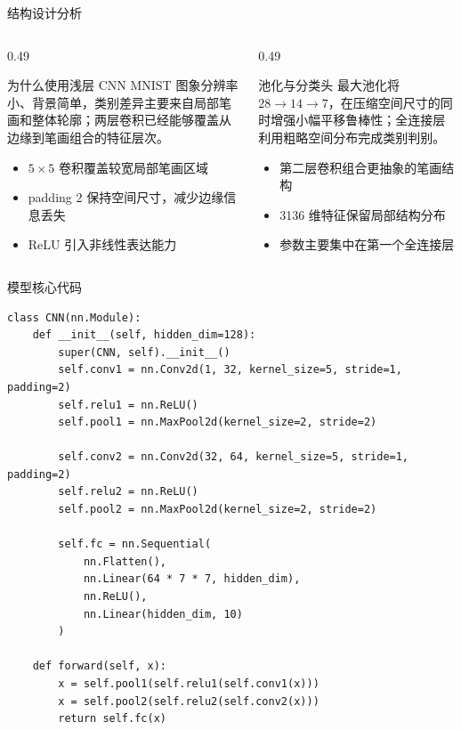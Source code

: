 \documentclass[aspectratio=169,10pt]{ctexbeamer}
\begin{document}
\begin{frame}{结构设计分析}
	\begin{columns}[T,onlytextwidth]
		\begin{column}{0.49\textwidth}
			\begin{block}{为什么使用浅层 CNN}
				MNIST 图象分辨率小、背景简单，类别差异主要来自局部笔画和整体轮廓；两层卷积已经能够覆盖从边缘到笔画组合的特征层次。
			\end{block}
			\begin{itemize}
				\item $5\times5$ 卷积覆盖较宽局部笔画区域
				\item padding 2 保持空间尺寸，减少边缘信息丢失
				\item ReLU 引入非线性表达能力
			\end{itemize}
		\end{column}
		\begin{column}{0.49\textwidth}
			\begin{block}{池化与分类头}
				最大池化将 $28\rightarrow14\rightarrow7$，在压缩空间尺寸的同时增强小幅平移鲁棒性；全连接层利用粗略空间分布完成类别判别。
			\end{block}
			\begin{itemize}
				\item 第二层卷积组合更抽象的笔画结构
				\item 3136 维特征保留局部结构分布
				\item 参数主要集中在第一个全连接层
			\end{itemize}
		\end{column}
	\end{columns}
\end{frame}

\begin{frame}[fragile]{模型核心代码}
\begin{lstlisting}
class CNN(nn.Module):
    def __init__(self, hidden_dim=128):
        super(CNN, self).__init__()
        self.conv1 = nn.Conv2d(1, 32, kernel_size=5, stride=1, padding=2)
        self.relu1 = nn.ReLU()
        self.pool1 = nn.MaxPool2d(kernel_size=2, stride=2)

        self.conv2 = nn.Conv2d(32, 64, kernel_size=5, stride=1, padding=2)
        self.relu2 = nn.ReLU()
        self.pool2 = nn.MaxPool2d(kernel_size=2, stride=2)

        self.fc = nn.Sequential(
            nn.Flatten(),
            nn.Linear(64 * 7 * 7, hidden_dim),
            nn.ReLU(),
            nn.Linear(hidden_dim, 10)
        )

    def forward(self, x):
        x = self.pool1(self.relu1(self.conv1(x)))
        x = self.pool2(self.relu2(self.conv2(x)))
        return self.fc(x)
\end{lstlisting}
\end{frame}
\end{document}
